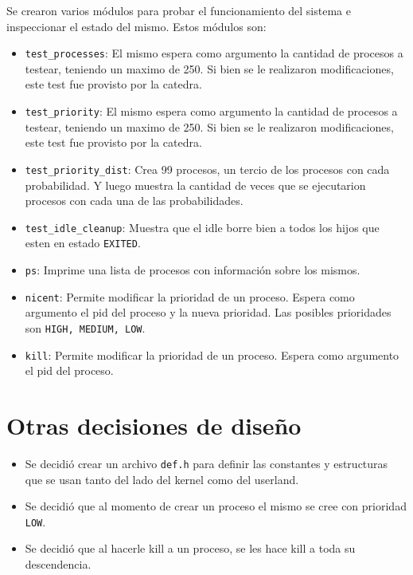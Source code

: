 \documentclass{article}
\begin{document}
Se crearon varios módulos para probar el funcionamiento del sistema e inspeccionar el estado del mismo. Estos módulos son:
\begin{itemize}
    \item \texttt{test\_processes}: El mismo espera como argumento la cantidad de procesos a testear, teniendo un maximo de 250. Si bien se le realizaron modificaciones, este test fue provisto por la catedra.
    \item \texttt{test\_priority}: El mismo espera como argumento la cantidad de procesos a testear, teniendo un maximo de 250. Si bien se le realizaron modificaciones, este test fue provisto por la catedra.
    \item \texttt{test\_priority\_dist}: Crea 99 procesos, un tercio de los procesos con cada probabilidad. Y luego muestra la cantidad de veces que se ejecutarion procesos con cada una de las probabilidades.
    \item \texttt{test\_idle\_cleanup}: Muestra que el idle borre bien a todos los hijos que esten en estado \texttt{EXITED}.
    \item \texttt{ps}: Imprime una lista de procesos con información sobre los mismos.
    \item \texttt{nicent}: Permite modificar la prioridad de un proceso. Espera como argumento el pid del proceso y la nueva prioridad. Las posibles prioridades son \texttt{HIGH, MEDIUM, LOW}.
    \item \texttt{kill}: Permite modificar la prioridad de un proceso. Espera como argumento el pid del proceso.
\end{itemize}

\section {Otras decisiones de diseño}
\begin{itemize}
    \item Se decidió crear un archivo \texttt{\texttt{def.h}} para definir las constantes y estructuras que se usan tanto del lado del kernel como del userland.
    \item Se decidió que al momento de crear un proceso el mismo se cree con prioridad \texttt{LOW}.
    \item Se decidió que al hacerle kill a un proceso, se les hace kill a toda su descendencia.
\end{itemize}
\end{document}
